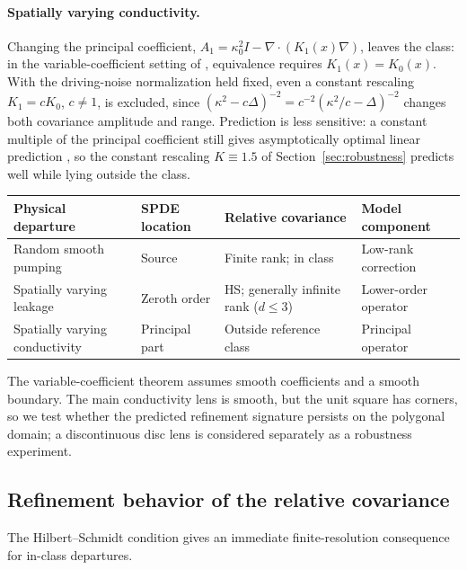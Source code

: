 \documentclass[11pt]{article}
\numberwithin{table}{section}
\numberwithin{figure}{section}
\begin{document}
\paragraph{Spatially varying conductivity.} Changing the principal coefficient, $A_1=\kappa_0^2I-\nabla\!\cdot(K_1(x)\nabla)$, leaves the class: in the variable-coefficient setting of \citet[Thm.~4.11 and Lemma~4.9]{BolinKirchner2023}, equivalence requires $K_1(x)=K_0(x)$. With the driving-noise normalization held fixed, even a constant rescaling $K_1=cK_0$, $c\neq1$, is excluded, since $(\kappa^2-c\Delta)^{-2}=c^{-2}(\kappa^2/c-\Delta)^{-2}$ changes both covariance amplitude and range. Prediction is less sensitive: a constant multiple of the principal coefficient still gives asymptotically optimal linear prediction \citep[Thm.~4.13]{BolinKirchner2023}, so the constant rescaling $K\equiv1.5$ of Section~\ref{sec:robustness} predicts well while lying outside the class.

\begin{center}
\small
\begin{tabular}{@{}llll@{}}
\toprule
Physical departure & SPDE location & Relative covariance & Model component\\
\midrule
Random smooth pumping & Source & Finite rank; in class & Low-rank correction\\
Spatially varying leakage & Zeroth order & HS; generally infinite rank ($d\le3$) & Lower-order operator\\
Spatially varying conductivity & Principal part & Outside reference class & Principal operator\\
\bottomrule
\end{tabular}
\end{center}

The variable-coefficient theorem assumes smooth coefficients and a smooth boundary. The main conductivity lens is smooth, but the unit square has corners, so we test whether the predicted refinement signature persists on the polygonal domain; a discontinuous disc lens is considered separately as a robustness experiment.

\subsection{Refinement behavior of the relative covariance}
\label{sec:refinement_criterion}

The Hilbert--Schmidt condition gives an immediate finite-resolution consequence for in-class departures.
\end{document}
